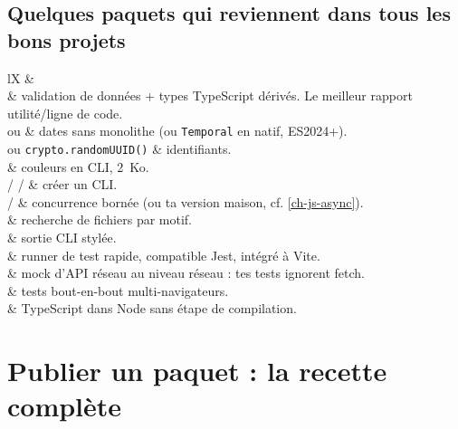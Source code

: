 \subsection{Quelques paquets qui reviennent dans tous les bons projets}

\begin{tabz}{lX}
  \headrow {} \&  \\
  \midrule
   \& validation de donn\'ees + types TypeScript d\'eriv\'es. Le meilleur rapport utilit\'e/ligne de code. \\
   ou  \& dates sans monolithe (ou \verb|Temporal| en natif, ES2024+). \\
   ou \verb|crypto.randomUUID()| \& identifiants. \\
   \& couleurs en CLI, 2~Ko. \\
   /  /  \& cr\'eer un CLI. \\
   /  \& concurrence born\'ee (ou ta version maison, cf. \cref{ch-js-async}). \\
   \& recherche de fichiers par motif. \\
   \& sortie CLI styl\'ee. \\
   \& runner de test rapide, compatible Jest, int\'egr\'e \`a Vite. \\
   \& mock d'API r\'eseau au niveau r\'eseau : tes tests ignorent fetch. \\
   \& tests bout-en-bout multi-navigateurs. \\
   \& TypeScript dans Node sans \'etape de compilation. \\
\end{tabz}

\section{Publier un paquet : la recette compl\`ete}

